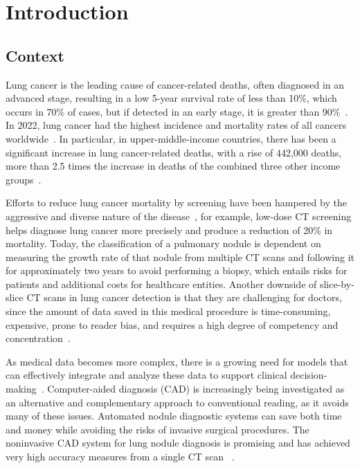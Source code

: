 \chapter{Introduction} \label{chap:intro}


\section{Context} \label{sec:context}

Lung cancer is the leading cause of cancer-related deaths, often diagnosed in an advanced stage, resulting in a low 5-year survival rate of less than 10\%, which occurs in 70\% of cases, but if detected in an early stage, it is greater than 90\%~\cite{bahmer_benefits_2011}. In 2022, lung cancer had the highest incidence and mortality rates of all cancers worldwide~\cite{international_agency_for_research_on_cancer_trachea_2024}. In particular, in upper-middle-income countries, there has been a significant increase in lung cancer-related deaths, with a rise of 442,000 deaths, more than 2.5 times the increase in deaths of the combined three other income groups~\cite{world_health_organization_top_2024}.

Efforts to reduce lung cancer mortality by screening have been hampered by the aggressive and diverse nature of the disease~\cite{national_lung_screening_trial_research_team_reduced_2011}, for example, low-dose CT screening helps diagnose lung cancer more precisely and produce a reduction of 20\% in mortality. Today, the classification of a pulmonary nodule is dependent on measuring the growth rate of that nodule from multiple CT scans and following it for approximately two years to avoid performing a biopsy, which entails risks for patients and additional costs for healthcare entities. Another downside of slice-by-slice CT scans in lung cancer detection is that they are challenging for doctors, since the amount of data saved in this medical procedure is time-consuming, expensive, prone to reader bias, and requires a high degree of competency and concentration~\cite{shaffie_computer-assisted_2022}.

As medical data becomes more complex, there is a growing need for models that can effectively integrate and analyze these data to support clinical decision-making~\cite{iqbal_fusion_2023}. Computer-aided diagnosis (CAD) is increasingly being investigated as an alternative and complementary approach to conventional reading, as it avoids many of these issues. Automated nodule diagnostic systems can save both time and money while avoiding the risks of invasive surgical procedures. The noninvasive CAD system for lung nodule diagnosis is promising and has achieved very high accuracy measures from a single CT scan ~\cite{shaffie_computer-assisted_2022}.


